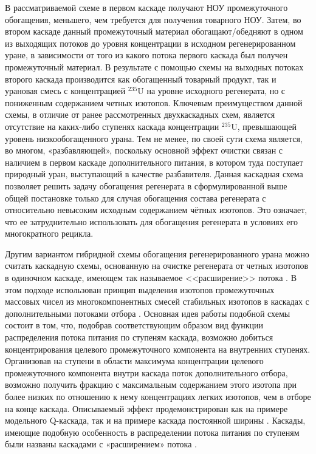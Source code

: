 В рассматриваемой схеме в первом каскаде получают НОУ промежуточного обогащения, меньшего, чем требуется для получения товарного НОУ. Затем, во втором каскаде данный промежуточный материал обогащают/обедняют в одном из выходящих потоков до уровня концентрации в исходном регенерированном уране, в зависимости от того из какого потока первого каскада был получен промежуточный материал. В результате с помощью схемы на выходных потоках второго каскада производится как обогащенный товарный продукт, так и урановая смесь с концентрацией $^{235}$U на уровне исходного регенерата, но с пониженным содержанием четных изотопов. Ключевым преимуществом данной схемы, в отличие от ранее рассмотренных двухкаскадных схем, является отсутствие на каких-либо ступенях каскада концентрации $^{235}$U, превышающей уровень низкообогащенного урана.
Тем не менее, по своей сути схема является, во многом, «разбавляющей», поскольку основной эффект очистки связан с наличием в первом каскаде дополнительного питания, в котором туда поступает природный уран, выступающий в качестве разбавителя.
Данная каскадная схема позволяет решить задачу обогащения регенерата в сформулированной выше общей постановке только для случая  обогащения состава регенерата с относительно невысоким исходным содержанием чётных изотопов. Это означает, что ее затруднительно использовать для обогащения регенерата в условиях его многократного рецикла.

Другим вариантом гибридной схемы обогащения регенерированного урана можно считать каскадную схемы, основанную на очистке регенерата от четных изотопов в одиночном каскаде, имеющем так называемое <<расширение>> потока \cite{palkinRestorationIsotopicComposition2020}. В этом подходе использован принцип выделения изотопов промежуточных массовых чисел из многокомпонентных смесей стабильных изотопов в каскадах с дополнительными потоками отбора \cite{smirnovQKASKADYDLYaPOLUChENIYa2013,smirnovVliyanieProfilyaPotoka2010,palkinMnogopotochnyeKaskadyDlya2015}. 
Основная идея работы подобной схемы состоит в том, что, подобрав соответствующим образом вид функции распределения потока питания по ступеням каскада, возможно добиться концентрирования целевого промежуточного компонента на внутренних ступенях. Организовав на ступени в области максимума концентрации целевого промежуточного компонента внутри каскада поток дополнительного отбора, возможно получить фракцию с максимальным содержанием этого изотопа при более низких по отношению к нему концентрациях легких изотопов, чем в отборе на конце каскада.
Описываемый эффект продемонстрирован как на примере модельного Q-каскада, так и на примере каскада постоянной ширины \cite{smirnovDesignCascadeLocally2015}. Каскады, имеющие подобную особенность в распределении потока питания по ступеням были названы каскадами с «расширением» потока \cite{smirnovVliyanieProfilyaPotoka2010}.

